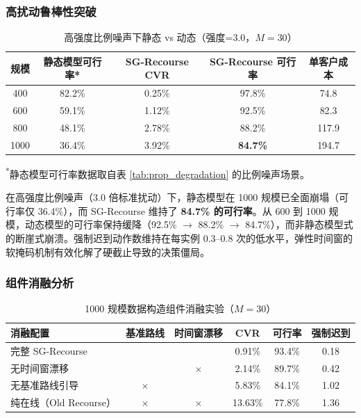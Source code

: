 \documentclass[12pt,a4paper,UTF8]{article}
\begin{document}
\subsubsection{高扰动鲁棒性突破}

\begin{table}[ht]
	\centering\small
	\caption{高强度比例噪声下静态 vs 动态（强度=3.0，$M=30$）}
	\label{tab:high_perturb}
	\begin{tabular}{ccccc}
		\toprule
		规模 & 静态模型可行率* & SG-Recourse CVR & SG-Recourse 可行率 & 单客户成本 \\
		\midrule
		400  & 82.2\% & 0.25\% & 97.8\% & 74.8  \\
		600  & 59.1\% & 1.12\% & 92.5\% & 82.3  \\
		800  & 48.1\% & 2.78\% & 88.2\% & 117.9 \\
		1000 & 36.4\% & 3.92\% & \textbf{84.7\%} & 194.7 \\
		\bottomrule
	\end{tabular}
\end{table}

\textsuperscript{*}静态模型可行率数据取自表 \ref{tab:prop_degradation} 的比例噪声场景。

在高强度比例噪声（3.0 倍标准扰动）下，静态模型在 1000 规模已全面崩塌（可行率仅 36.4\%），而 SG-Recourse 维持了 \textbf{84.7\% 的可行率}。从 600 到 1000 规模，动态模型的可行率保持缓降（92.5\% $\rightarrow$ 88.2\% $\rightarrow$ 84.7\%），而非静态模型式的断崖式崩溃。强制迟到动作数维持在每实例 0.3--0.8 次的低水平，弹性时间窗的软掩码机制有效化解了硬截止导致的决策僵局。

\subsubsection{组件消融分析}

\begin{table}[htbp]
	\centering
	\caption{1000 规模数据构造组件消融实验（$M=30$）}
	\label{tab:ablation}
	\begin{tabular}{lccccc}
		\toprule
		消融配置 & 基准路线 & 时间窗漂移 & CVR & 可行率 & 强制迟到 \\
		\midrule
		完整 SG-Recourse   & \checkmark & \checkmark & 0.91\%  & 93.4\% & 0.18 \\
		无时间窗漂移        & \checkmark & $\times$   & 2.14\%  & 89.7\% & 0.42 \\
		无基准路线引导      & $\times$   & \checkmark & 5.83\%  & 84.1\% & 1.02 \\
		纯在线（Old Recourse）& $\times$   & $\times$   & 13.63\% & 77.8\% & 1.36 \\
		\bottomrule
	\end{tabular}
\end{table}
\end{document}
